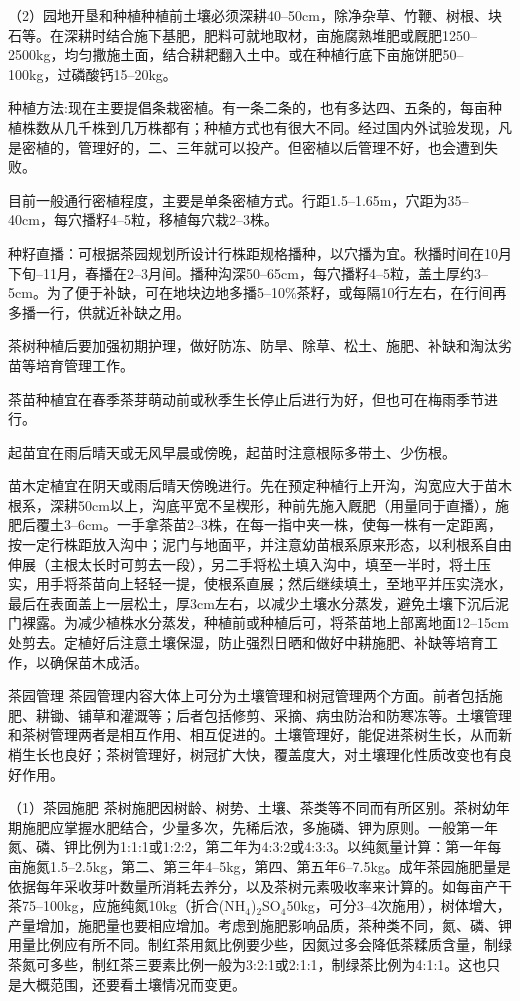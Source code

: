 \documentclass{ctexbook}
\begin{document}
（2）园地开垦和种植种植前土壤必须深耕40--50cm，除净杂草、竹鞭、树根、块石等。在深耕时结合施下基肥，肥料可就地取材，亩施腐熟堆肥或厩肥1250--2500kg，均匀撒施土面，结合耕耙翻入土中。或在种植行底下亩施饼肥50--100kg，过磷酸钙15--20kg。

种植方法:现在主要提倡条栽密植。有一条二条的，也有多达四、五条的，每亩种植株数从几千株到几万株都有；种植方式也有很大不同。经过国内外试验发现，凡是密植的，管理好的，二、三年就可以投产。但密植以后管理不好，也会遭到失败。

目前一般通行密植程度，主要是单条密植方式。行距1.5--1.65m，穴距为35--40cm，每穴播籽4--5粒，移植每穴栽2--3株。

种籽直播：可根据茶园规划所设计行株距规格播种，以穴播为宜。秋播时间在10月下旬--11月，春播在2--3月间。播种沟深50--65cm，每穴播籽4--5粒，盖土厚约3--5cm。为了便于补缺，可在地块边地多播5--10\%茶籽，或每隔10行左右，在行间再多播一行，供就近补缺之用。

茶树种植后要加强初期护理，做好防冻、防旱、除草、松土、施肥、补缺和淘汰劣苗等培育管理工作。

茶苗种植宜在春季茶芽萌动前或秋季生长停止后进行为好，但也可在梅雨季节进行。

起苗宜在雨后晴天或无风早晨或傍晚，起苗时注意根际多带土、少伤根。

苗木定植宜在阴天或雨后晴天傍晚进行。先在预定种植行上开沟，沟宽应大于苗木根系，深耕50cm以上，沟底平宽不呈楔形，种前先施入厩肥（用量同于直播），施肥后覆土3--6cm。一手拿茶苗2--3株，在每一指中夹一株，使每一株有一定距离，按一定行株距放入沟中；泥门与地面平，并注意幼苗根系原来形态，以利根系自由伸展（主根太长时可剪去一段），另二手将松土填入沟中，填至一半时，将土压实，用手将茶苗向上轻轻一提，使根系直展；然后继续填土，至地平并压实浇水，最后在表面盖上一层松土，厚3cm左右，以减少土壤水分蒸发，避免土壤下沉后泥门裸露。为减少植株水分蒸发，种植前或种植后可，将茶苗地上部离地面12--15cm处剪去。定植好后注意土壤保湿，防止强烈日晒和做好中耕施肥、补缺等培育工作，以确保苗木成活。

茶园管理 茶园管理内容大体上可分为土壤管理和树冠管理两个方面。前者包括施肥、耕锄、铺草和灌溉等；后者包括修剪、采摘、病虫防治和防寒冻等。土壤管理和茶树管理两者是相互作用、相互促进的。土壤管理好，能促进茶树生长，从而新梢生长也良好；茶树管理好，树冠扩大快，覆盖度大，对土壤理化性质改变也有良好作用。

（1）茶园施肥 茶树施肥因树龄、树势、土壤、茶类等不同而有所区别。茶树幼年期施肥应掌握水肥结合，少量多次，先稀后浓，多施磷、钾为原则。一般第一年氮、磷、钾比例为1:1:1或1:2:2，第二年为4:3:2或4:3:3。以纯氮量计算：第一年每亩施氮1.5--2.5kg，第二、第三年4--5kg，第四、第五年6--7.5kg。成年茶园施肥量是依据每年采收芽叶数量所消耗去养分，以及茶树元素吸收率来计算的。如每亩产干茶75--100kg，应施纯氮10kg（折合(NH$_4$)$_2$SO$_4$50kg，可分3--4次施用），树体增大，产量增加，施肥量也要相应增加。考虑到施肥影响品质，茶种类不同，氮、磷、钾用量比例应有所不同。制红茶用氮比例要少些，因氮过多会降低茶糅质含量，制绿茶氮可多些，制红茶三要素比例一般为3:2:1或2:1:1，制绿茶比例为4:1:1。这也只是大概范围，还要看土壤情况而变更。
\end{document}
